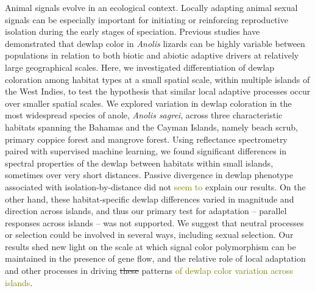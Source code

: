 Animal signals evolve in an ecological context. Locally adapting animal sexual signals can be especially important for initiating or reinforcing reproductive isolation during the early stages of speciation. Previous studies have demonstrated that dewlap color in \textit{Anolis} lizards can be highly variable between populations in relation to both biotic and abiotic adaptive drivers at relatively large geographical scales. Here, we investigated differentiation of dewlap coloration among habitat types at a small spatial scale, within multiple islands of the West Indies, to test the hypothesis that similar local adaptive processes occur over smaller spatial scales. We explored variation in dewlap coloration in the most widespread species of anole, \textit{Anolis sagrei}, across three characteristic habitats spanning the Bahamas and the Cayman Islands, namely beach scrub, primary coppice forest and mangrove forest. Using reflectance spectrometry paired with supervised machine learning, we found significant differences in spectral properties of the dewlap between habitats within small islands, sometimes over very short distances. Passive divergence in dewlap phenotype associated with isolation-by-distance did not \textcolor{olive}{seem to} explain our results. On the other hand, these habitat-specific dewlap differences varied in magnitude and direction across islands, and thus our primary test for adaptation -- parallel responses across islands -- was not supported. We suggest that neutral processes or selection could be involved in several ways, including sexual selection. Our results shed new light on the scale at which signal color polymorphism can be maintained in the presence of gene flow, and the relative role of local adaptation and other processes in driving \sout{these} patterns \textcolor{olive}{of dewlap color variation across islands}.


